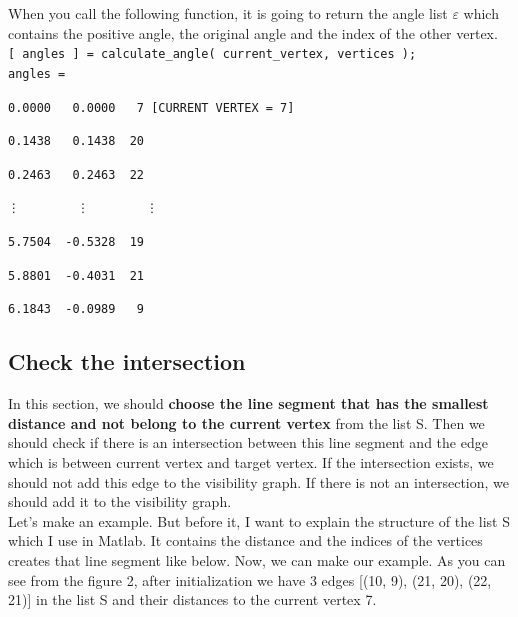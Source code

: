 \documentclass{article}
\begin{document}
When you call the following function, it is going to return the angle list $\varepsilon$ which contains the positive angle, the original angle and the index of the other vertex.
\\

\hspace{1cm}\texttt{[ angles ] = calculate\_angle( current\_vertex, vertices );}
\\

\hspace{1cm}\texttt{angles =}

\hspace{2cm}\texttt{0.0000 \ \ 0.0000 \ \ 7 [CURRENT VERTEX = 7]}

\hspace{2cm}\texttt{0.1438 \ \ 0.1438 \ 20}

\hspace{2cm}\texttt{0.2463 \ \ 0.2463 \ 22}

\hspace{2cm}\texttt{\vdots \ \ \ \ \ \ \ \ \vdots \ \ \ \ \ \ \ \ \vdots }

\hspace{2cm}\texttt{5.7504 \ -0.5328 \ 19}

\hspace{2cm}\texttt{5.8801 \ -0.4031 \ 21}

\hspace{2cm}\texttt{6.1843 \ -0.0989 \ \ 9}

\subsection{Check the intersection}

In this section, we should \textbf{choose the line segment that has the smallest distance and not belong to the current vertex} from the list S. Then we should check if there is an intersection between this line segment and the edge which is between current vertex and target vertex. If the intersection exists, we should not add this edge to the visibility graph. If there is not an intersection, we should add it to the visibility graph.
\\

Let's make an example. But before it, I want to explain the structure of the list S which I use in Matlab. It contains the distance and the indices of the vertices creates that line segment like below. Now, we can make our example. As you can see from the figure 2, after initialization we have 3 edges [(10, 9), (21, 20), (22, 21)] in the list S and their distances to the current vertex 7.
\\
\end{document}
